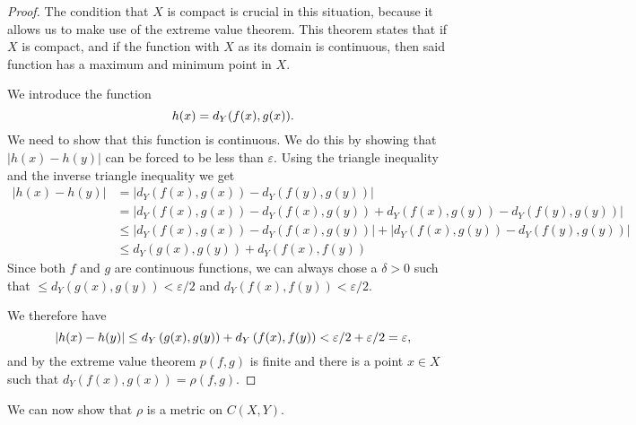 \documentclass[a4paper]{report}
\theoremstyle{definition}
\begin{document}
\begin{proof}

  The condition that $X$ is compact is crucial in this situation, because it
  allows us to make use of the extreme value theorem. This theorem states that
  if $X$ is compact, and if the function with $X$ as its domain is continuous,
  then said function has a maximum and minimum point in $X$. 

  We introduce the function
  \begin{equation}
    \notag
    h(x) = d_Y(f(x), g(x)).
  \end{equation}
  We need to show that this function is continuous. We do this by showing that
  $|h(x) - h(y)|$ can be forced to be less than $\varepsilon$.  Using the
  triangle inequality and the inverse triangle inequality we get
  \begin{align*}
    |h(x) - h(y)| &= | d_{Y}\left( f(x), g(x) \right) - d_{Y}\left( f(y), g(y) \right) | \\
    &= | d_{Y}\left( f(x), g(x) \right) - d_{Y}\left( f(x), g(y) \right) + d_{Y}\left( f(x), g(y) \right) - d_{Y}\left( f(y), g(y) \right) | \\
    &\leq | d_{Y}\left( f(x), g(x) \right) - d_{Y}\left( f(x), g(y) \right)| + |d_{Y}\left( f(x), g(y) \right) - d_{Y}\left( f(y), g(y) \right) | \\
    &\leq d_{Y}\left( g(x), g(y) \right) + d_{Y}\left( f(x), f(y) \right)
  \end{align*}
  Since both $f$ and $g$ are continuous functions, we can always chose a
  $\delta > 0$ such that $\leq d_{Y}\left( g(x), g(y) \right) < \varepsilon/2$
  and $ d_{Y}\left( f(x), f(y) \right) < \varepsilon/2$.

  We therefore have
  \begin{equation}
    \notag
    |h(x) - h(y)| \leq d_{Y}\left( g(x), g(y) \right) + d_{Y}\left( f(x), f(y)
    \right) < \varepsilon/2 + \varepsilon/2 = \varepsilon, 
  \end{equation}
  and by the extreme value theorem $p(f, g)$ is finite and there is a point $x
  \in X$ such that $d_{Y}\left( f(x), g(x) \right) = \rho(f, g)$.

\end{proof}
We can now show that $\rho$ is a metric on $C(X, Y)$.
\end{document}

